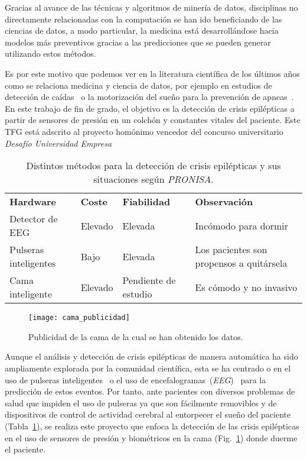 
Gracias al avance de las técnicas y algoritmos de minería de datos, disciplinas no directamente relacionadas con la computación se han ido beneficiando de las ciencias de datos, a modo particular, la medicina está desarrollándose hacia modelos más preventivos gracias a las predicciones que se pueden generar utilizando estos métodos.

Es por este motivo que podemos ver en la literatura científica de los últimos años como se relaciona medicina y ciencia de datos, por ejemplo en estudios de detección de caídas~\cite{tolkiehn2011fall} o la motorización del sueño para la prevención de apneas~\cite{kortelainen2012sleepmonitoring}. En este trabajo de fin de grado, el objetivo es la detección de crisis epilépticas a partir de sensores de presión en un colchón y constantes vitales del paciente. Este TFG está adscrito al proyecto homónimo vencedor del concurso universitario \textit{Desafío Universidad Empresa}~\cite{radio:radio_amiga_burgos_2018}

\begin{table}
	\centering
	\resizebox{\textwidth}{!}
	{\begin{tabular}{llll}
			\toprule
			\textbf{Hardware} & \textbf{Coste} & \textbf{Fiabilidad} & \textbf{Observación} \\ 
			\otoprule 
			Detector de EEG & Elevado & Elevada & Incómodo para dormir \\ 
			Pulseras inteligentes & Bajo & Elevada & Los pacientes son propensos a quitársela \\ 
			Cama inteligente & Elevado & Pendiente de estudio & Es cómodo y no invasivo \\ 
			\bottomrule
	\end{tabular}}
	\caption{Distintos métodos para la detección de crisis epilépticas y sus situaciones según \textit{PRONISA}.}
	\label{tab:modelos}
\end{table}

\begin{figure}
	\centering
	\texttt{[image: cama\_publicidad]}
	\caption{Publicidad de la cama de la cual se han obtenido los datos.}
	\label{fig:cama_publi}
\end{figure}

Aunque el análisis y detección de crisis epilépticas de manera automática ha sido ampliamente explorada por la comunidad científica, esta se ha centrado o en el uso de pulseras inteligentes~\cite{ramgopal2014product_review} o el uso de encefalogramas~(\textit{EEG})~\cite{jeppesen2017modified,kumar2014epilepticeeg,tzallas2012review} para la predicción de estos eventos. Por tanto, ante pacientes con diversos problemas de salud que impiden el uso de pulseras ya que son fácilmente removibles y de dispositivos de control de actividad cerebral al entorpecer el sueño del paciente (Tabla~\ref{tab:modelos}), se realiza este proyecto que enfoca la detección de las crisis epilépticas en el uso de sensores de presión y biométricos en la cama (Fig.~\ref{fig:cama_publi}) donde duerme el paciente. 




